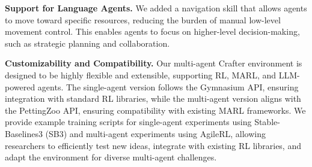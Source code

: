 {\textbf{Support for Language Agents.} We added a navigation skill that allows agents to move toward specific resources, reducing the burden of manual low-level movement control. This enables agents to focus on higher-level decision-making, such as strategic planning and collaboration.

\textbf{Customizability and Compatibility.}
Our multi-agent Crafter environment is designed to be highly flexible and extensible, supporting RL, MARL, and LLM-powered agents. The single-agent version follows the Gymnasium API, ensuring integration with standard RL libraries, while the multi-agent version aligns with the PettingZoo API, ensuring compatibility with existing MARL frameworks. We provide example training scripts for single-agent experiments using Stable-Baselines3 (SB3) and multi-agent experiments using AgileRL, allowing researchers to efficiently test new ideas, integrate with existing RL libraries, and adapt the environment for diverse multi-agent challenges.
}







